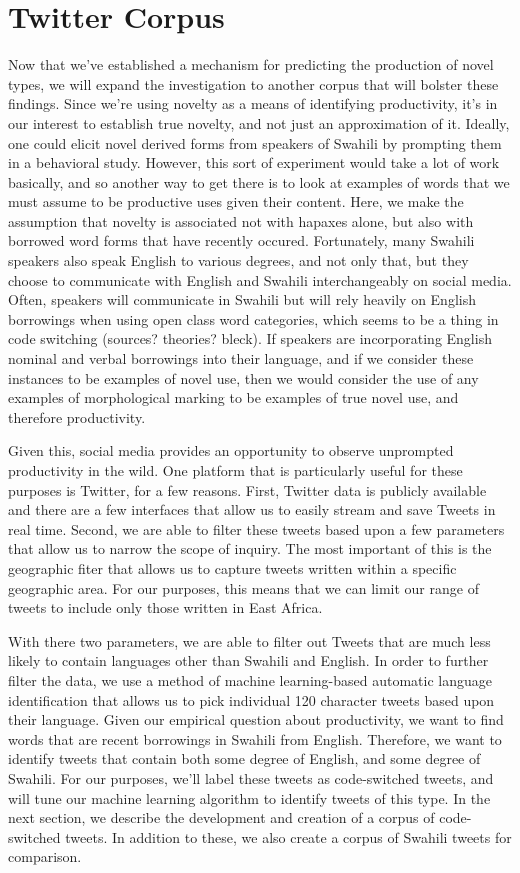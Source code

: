 \documentclass[12pt]{article}\usepackage[]{graphicx}\usepackage[]{color}
\begin{document}
\section{Twitter Corpus}

Now that we've established a mechanism for predicting the production of novel types, we will expand the investigation to another corpus that will bolster these findings. Since we're using novelty as a means of identifying productivity, it's in our interest to establish true novelty, and not just an approximation of it. Ideally, one could elicit novel derived forms from speakers of Swahili by prompting them in a behavioral study. However, this sort of experiment would take a lot of work basically, and so another way to get there is to look at examples of words that we must assume to be productive uses given their content. Here, we make the assumption that novelty is associated not with hapaxes alone, but also with borrowed word forms that have recently occured. Fortunately, many Swahili speakers also speak English to various degrees, and not only that, but they choose to communicate with English and Swahili interchangeably on social media. Often, speakers will communicate in Swahili but will rely heavily on English borrowings when using open class word categories, which seems to be a thing in code switching (sources? theories? bleck). If speakers are incorporating English nominal and verbal borrowings into their language, and if we consider these instances to be examples of novel use, then we would consider the use of any examples of morphological marking to be examples of true novel use, and therefore productivity.

Given this, social media provides an opportunity to observe unprompted productivity in the wild. One platform that is particularly useful for these purposes is Twitter, for a few reasons. First, Twitter data is publicly available and there are a few interfaces that allow us to easily stream and save Tweets in real time. Second, we are able to filter these tweets based upon a few parameters that allow us to narrow the scope of inquiry. The most important of this is the geographic fiter that allows us to capture tweets written within a specific geographic area. For our purposes, this means that we can limit our range of tweets to include only those written in East Africa.

With there two parameters, we are able to filter out Tweets that are much less likely to contain languages other than Swahili and English. In order to further filter the data, we use a method of machine learning-based automatic language identification that allows us to pick individual 120 character tweets based upon their language. Given our empirical question about productivity, we want to find words that are recent borrowings in Swahili from English. Therefore, we want to identify tweets that contain both some degree of English, and some degree of Swahili. For our purposes, we'll label these tweets as code-switched tweets, and will tune our machine learning algorithm to identify tweets of this type. In the next section, we describe the development and creation of a corpus of code-switched tweets. In addition to these, we also create a corpus of Swahili tweets for comparison.
\end{document}

